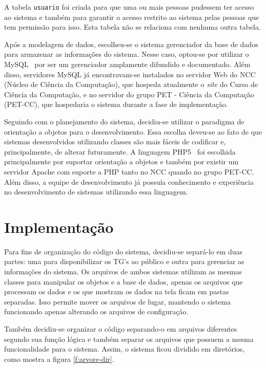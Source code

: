 \documentclass[12pt]{article}
\newcommand{\site}{\textit{site}\xspace}
\begin{document}
A tabela \texttt{usuario} foi criada para que uma ou mais pessoas pudessem ter acesso ao sistema e tamb\'{e}m para garantir o acesso restrito ao sistema pelas pessoas que tem permiss\~{a}o para isso. Esta tabela n\~{a}o se relaciona com nenhuma outra tabela.

Ap\'{o}s a modelagem de dados, escolheu-se o sistema gerenciador da base de dados para armazenar as informa\c{c}\~{o}es do sistema. Nesse caso, optou-se por utilizar o MySQL~\cite{mysql} por ser um gerenciador amplamente difundido e documentado. Al\'{e}m disso, servidores MySQL j\'{a} encontravam-se instalados no servidor Web do NCC (N\'{u}cleo de Ci\^{e}ncia da Computa\c{c}\~{a}o), que hospeda atualmente o \site do Curso de Ci\^{e}ncia da Computa\c{c}\~{a}o, e no servidor do grupo PET - Ci\^{e}ncia da Computa\c{c}\~{a}o (PET-CC), que hospedaria o sistema durante a fase de implementa\c{c}\~{a}o. 

Seguindo com o planejamento do sistema, decidiu-se utilizar o paradigma de orienta\c{c}\~{a}o a objetos para o desenvolvimento. Essa escolha deveu-se ao fato de que sistemas desenvolvidos utilizando classes s\~{a}o mais f\'{a}ceis de codificar e, principalmente, de alterar futuramente. A linguagem PHP5~\cite{php} foi escolhida principalmente por suportar orienta\c{c}\~{a}o a objetos e tamb\'{e}m por existir um servidor Apache com suporte a PHP tanto no NCC quando no grupo PET-CC. Al\'{e}m disso, a equipe de desenvolvimento j\'{a} possuía conhecimento e experi\^{e}ncia no desenvolvimento de sistemas utilizando essa linguagem.


\section{Implementa\c{c}\~{a}o}

Para fins de organiza\c{c}\~{a}o do c\'{o}digo do sistema, decidiu-se separ\'{a}-lo em duas partes: uma para disponibilizar os TG's ao p\'{u}blico e outra para gerenciar as informa\c{c}\~{o}es do sistema. Os arquivos de ambos sistemas utilizam as mesmas classes para manipular os objetos e a base de dados, apenas os arquivos que processam os dados e os que mostram os dados na tela ficam em pastas separadas. Isso permite mover os arquivos de lugar, mantendo o sistema funcionando apenas alterando os arquivos de configura\c{c}\~{a}o.

Tamb\'{e}m decidiu-se organizar o c\'{o}digo separando-o em arquivos diferentes segundo sua fun\c{c}\~{a}o l\'{o}gica e tamb\'{e}m separar os arquivos que possuem a mesma funcionalidade para o sistema. Assim, o sistema ficou dividido em diret\'{o}rios, como mostra a figura \ref{f:arvore-dir}.
\end{document}
